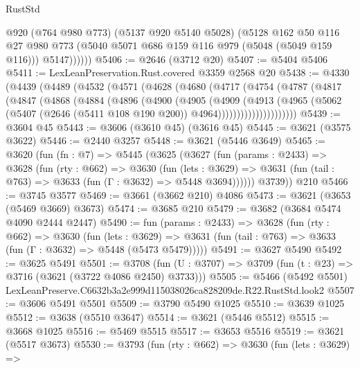 \begin{lexlean}{RustStd}
\begin{coremodule}
              @920
              (@764 @980 @773)
              (@5137 @920 @5140 @5028)
              (@5128
                @162
                @50
                @116
                @27
                @980
                @773
                (@5040 @5071 @686 @159 @116 @979 (@5048 (@5049 @159 @116)))
                @5147))))))
@5406 := @2646 (@3712 @20)
@5407 := @5404 @5406
@5411 := LexLeanPreservation.Rust.covered @3359 @2568 @20
@5438 := @4330
    (@4439
      (@4489
        (@4532
          (@4571
            (@4628
              (@4680
                (@4717
                  (@4754
                    (@4787
                      (@4817
                        (@4847
                          (@4868
                            (@4884
                              (@4896
                                (@4900
                                  (@4905
                                    (@4909
                                      (@4913
                                        (@4965
                                          (@5062
                                            (@5407
                                              (@2646 (@5411 @108 @190 @200))
                                              @4964)))))))))))))))))))))
@5439 := @3604 @45
@5443 := @3606 (@3610 @45) (@3616 @45)
@5445 := @3621 (@3575 @3622)
@5446 := @2440 @3257
@5448 := @3621 (@5446 @3649)
@5465 := @3620
    (fun (fn : @7) =>
    @5445
      (@3625
        (@3627
          (fun (params : @2433) =>
          @3628
            (fun (rty : @662) =>
            @3630
              (fun (lets : @3629) =>
              @3631 (fun (tail : @763) => @3633 (fun (Γ : @3632) => @5448 @3694))))))
        @3739))
    @210
@5466 := @3745 @3577
@5469 := @3661 (@3662 @210) @4086
@5473 := @3621 (@3653 (@5469 @3669) @3673)
@5474 := @3685 @210
@5479 := @3682 (@3684 @5474 @4090 @2444 @2447)
@5490 := fun (params : @2433) =>
  @3628
    (fun (rty : @662) =>
    @3630
      (fun (lets : @3629) =>
      @3631 (fun (tail : @763) => @3633 (fun (Γ : @3632) => @5448 (@5473 @5479)))))
@5491 := @3627 @5490
@5492 := @3625 @5491
@5501 := @3708 (fun (U : @3707) => @3709 (fun (t : @23) => @3716 (@3621 (@3722 @4086 @2450) @3733)))
@5505 := @5466 (@5492 @5501) LexLeanPreserve.C6632b3a2e999d115038026ca828209de.R22.RustStd.look2
@5507 := @3606 @5491 @5501
@5509 := @3790 @5490 @1025
@5510 := @3639 @1025
@5512 := @3638 (@5510 @3647)
@5514 := @3621 (@5446 @5512)
@5515 := @3668 @1025
@5516 := @5469 @5515
@5517 := @3653 @5516
@5519 := @3621 (@5517 @3673)
@5530 := @3793
    (fun (rty : @662) =>
    @3630
      (fun (lets : @3629) =>

\end{coremodule}
\end{lexlean}

